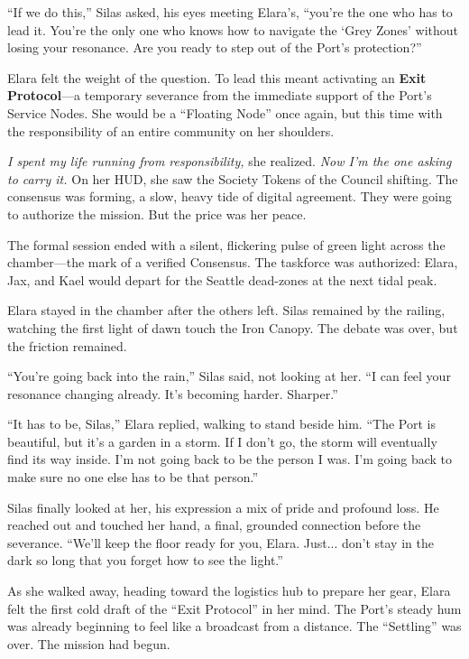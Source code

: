 ``If we do this,'' Silas asked, his eyes meeting Elara's, ``you're the one who has to lead it. You're the only one who knows how to navigate the `Grey Zones' without losing your resonance. Are you ready to step out of the Port's protection?''

Elara felt the weight of the question. To lead this meant activating an \textbf{Exit Protocol}—a temporary severance from the immediate support of the Port's Service Nodes. She would be a ``Floating Node'' once again, but this time with the responsibility of an entire community on her shoulders. 

\textit{I spent my life running from responsibility,} she realized. \textit{Now I'm the one asking to carry it.} On her HUD, she saw the Society Tokens of the Council shifting. The consensus was forming, a slow, heavy tide of digital agreement. They were going to authorize the mission. But the price was her peace.


The formal session ended with a silent, flickering pulse of green light across the chamber—the mark of a verified Consensus. The taskforce was authorized: Elara, Jax, and Kael would depart for the Seattle dead-zones at the next tidal peak. 

Elara stayed in the chamber after the others left. Silas remained by the railing, watching the first light of dawn touch the Iron Canopy. The debate was over, but the friction remained. 

``You're going back into the rain,'' Silas said, not looking at her. ``I can feel your resonance changing already. It's becoming harder. Sharper.''

``It has to be, Silas,'' Elara replied, walking to stand beside him. ``The Port is beautiful, but it's a garden in a storm. If I don't go, the storm will eventually find its way inside. I'm not going back to be the person I was. I'm going back to make sure no one else has to be that person.”

Silas finally looked at her, his expression a mix of pride and profound loss. He reached out and touched her hand, a final, grounded connection before the severance. ``We'll keep the floor ready for you, Elara. Just... don't stay in the dark so long that you forget how to see the light.''

As she walked away, heading toward the logistics hub to prepare her gear, Elara felt the first cold draft of the ``Exit Protocol'' in her mind. The Port's steady hum was already beginning to feel like a broadcast from a distance. The ``Settling'' was over. The mission had begun.
